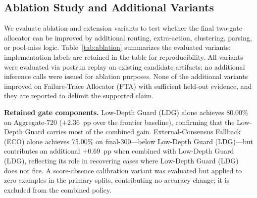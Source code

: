 \subsection{Ablation Study and Additional Variants}
\label{sec:ablation}

We evaluate ablation and extension variants to test whether the final two-gate
allocator can be improved by additional routing, extra-action, clustering, parsing,
or pool-miss logic.
Table~\ref{tab:ablation} summarizes the evaluated variants; implementation labels are retained in the table for reproducibility.
All variants were evaluated via postrun replay on existing candidate artifacts;
no additional inference calls were issued for ablation purposes.
None of the additional variants improved on Failure-Trace Allocator (FTA) with sufficient held-out evidence, and they are
reported to delimit the supported claim.

\medskip\noindent\textbf{Retained gate components.}
Low-Depth Guard (LDG) alone achieves 80.00\% on Aggregate-720 ($+2.36$~pp over the frontier
baseline), confirming that the Low-Depth Guard carries most of the combined gain.
External-Consensus Fallback (ECO) alone achieves 75.00\% on final-300---below Low-Depth Guard (LDG)---but contributes an
additional $+0.69$~pp when combined with Low-Depth Guard (LDG), reflecting its role in recovering
cases where Low-Depth Guard (LDG) does not fire.
A score-absence calibration variant was evaluated but applied to
zero examples in the primary splits, contributing no accuracy change; it is
excluded from the combined policy.


